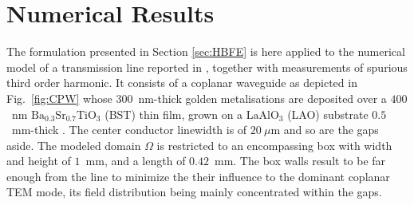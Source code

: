 \documentclass[journal,twoside,letterpaper]{IEEEtran}
\begin{document}
\section{Numerical Results}
\label{sec:results}

The formulation presented in Section \ref{sec:HBFE}  is here applied to the numerical model of a transmission line reported in \cite{mateu2006measurements}, together with measurements of spurious third order harmonic. It consists of a coplanar waveguide as depicted in Fig.~\ref{fig:CPW} whose $300$~nm-thick golden metalisations are deposited over a $400$~nm $\text{Ba}_{0.3}\text{Sr}_{0.7}\text{TiO}_{3}$ (BST) thin film, grown on a $\text{LaAlO}_3$ (LAO) substrate $0.5$~mm-thick \cite{mateu2007frequency}. The center conductor linewidth is of $20~{\mu}$m and so are the gaps aside. The modeled domain $\Omega$ is restricted to an encompassing box with width and height of  $1$~mm, and a length of $0.42$~mm. The box walls result to be far enough from the line to minimize the their influence to the dominant coplanar TEM mode, its field distribution being mainly concentrated within the gaps.
\end{document}
